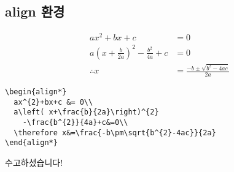 \documentclass{beamer}
\begin{document}
\subsection{align 환경}

\begin{frame}[fragile]

\begin{block}{}
\begin{align*}
ax^{2}+bx+c &= 0\\
a\left( x+\frac{b}{2a}\right)^{2}-\frac{b^{2}}{4a}+c&=0\\
\therefore x&=\frac{-b\pm\sqrt{b^{2}-4ac}}{2a}
\end{align*}

\end{block}
\begin{block}{}
\begin{center}
\begin{verbatim}
\begin{align*}
  ax^{2}+bx+c &= 0\\
  a\left( x+\frac{b}{2a}\right)^{2}
    -\frac{b^{2}}{4a}+c&=0\\
  \therefore x&=\frac{-b\pm\sqrt{b^{2}-4ac}}{2a}
\end{align*}
\end{verbatim}
\end{center}

\end{block}
\end{frame}

\begin{frame}
\begin{block}{}
\begin{center}
\huge
	수고하셨습니다!
\end{center}
\end{block}
\end{frame}
\end{document}
